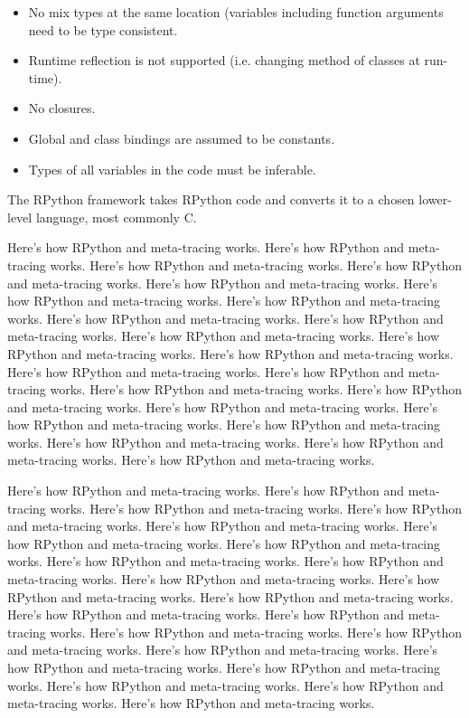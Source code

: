 \begin{itemize}
\item No mix types at the same location (variables including function arguments need to be type consistent.
\item Runtime reflection is not supported (i.e. changing method of classes at run-time).
\item No closures.
\item Global and class bindings are assumed to be constants.
\item Types of all variables in the code must be inferable.
\end{itemize}

The RPython framework takes RPython code and converts it to a chosen
lower-level language, most commonly C.

Here's how RPython and meta-tracing works. Here's how RPython and meta-tracing works. Here's how RPython and meta-tracing works. Here's how RPython and meta-tracing works. Here's how RPython and meta-tracing works. Here's how RPython and meta-tracing works. Here's how RPython and meta-tracing works. Here's how RPython and meta-tracing works. Here's how RPython and meta-tracing works. Here's how RPython and meta-tracing works. Here's how RPython and meta-tracing works. Here's how RPython and meta-tracing works. Here's how RPython and meta-tracing works. Here's how RPython and meta-tracing works. Here's how RPython and meta-tracing works. Here's how RPython and meta-tracing works. Here's how RPython and meta-tracing works. Here's how RPython and meta-tracing works. Here's how RPython and meta-tracing works. Here's how RPython and meta-tracing works. Here's how RPython and meta-tracing works. Here's how RPython and meta-tracing works.

Here's how RPython and meta-tracing works. Here's how RPython and meta-tracing works. Here's how RPython and meta-tracing works. Here's how RPython and meta-tracing works. Here's how RPython and meta-tracing works. Here's how RPython and meta-tracing works. Here's how RPython and meta-tracing works. Here's how RPython and meta-tracing works. Here's how RPython and meta-tracing works. Here's how RPython and meta-tracing works. Here's how RPython and meta-tracing works. Here's how RPython and meta-tracing works. Here's how RPython and meta-tracing works. Here's how RPython and meta-tracing works. Here's how RPython and meta-tracing works. Here's how RPython and meta-tracing works. Here's how RPython and meta-tracing works. Here's how RPython and meta-tracing works. Here's how RPython and meta-tracing works. Here's how RPython and meta-tracing works. Here's how RPython and meta-tracing works. Here's how RPython and meta-tracing works.
